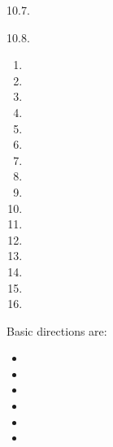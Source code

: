 \begin{refsection}
\begin{practiceproblemsolution}{10.7. \langnameTabaq}
\end{practiceproblemsolution}


\begin{practiceproblemsolution}{10.8. \langnameAralle}

\begin{solutions}[label=Solution 10.8\alph*]
    \item
    \begin{multicols}{4}
        \begin{enumerate}

            \item {}
            \item {}
            \item {}
            \item {}
            \item {}
            \item {}
            \item {}
            \item {}
            \item {}
            \item {}
            \item {}
            \item {}
            \item {}
            \item {}
            \item {}
            \item[] \quad
        \end{enumerate}
    \end{multicols}
\end{solutions}


Basic directions are:
\begin{multicols}{2}
    \begin{itemize}

        \item[] 
        \item[] 
        \item[] 
        \item[] 
        \item[] 
        \item[] 
    \end{itemize}
\end{multicols}


\end{practiceproblemsolution}
\end{refsection}
